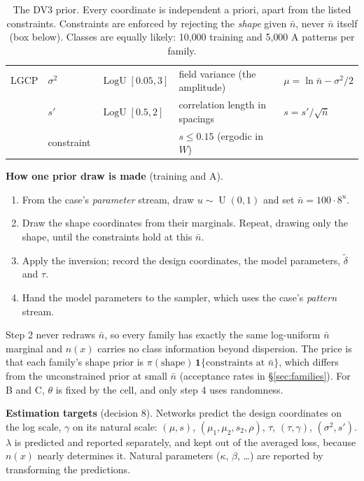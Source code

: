\documentclass[10pt,a4paper]{article}
\newcommand{\nbar}{\bar n}
\newcommand{\dtil}{\tilde\delta}
\newcommand{\LogU}{\operatorname{LogU}}
\newcommand{\Unif}{\operatorname{U}}
\newenvironment{keybox}{\par\smallskip\noindent\begin{lrbox}{\keyboxsave}\begin{minipage}{\dimexpr\linewidth-2\fboxsep-2\fboxrule\relax}\small\setlength{\parskip}{0.4em}}{\end{minipage}\end{lrbox}\fbox{\usebox{\keyboxsave}}\par\smallskip}
\begin{document}
\begin{table}[ht]
\begin{tabularx}{\linewidth}{@{}l l l L L@{}}
\addlinespace
LGCP & $\sigma^2$ & $\LogU[0.05,3]$ & field variance (the amplitude) & $\mu=\ln\nbar-\sigma^2/2$\\
 & $s'$ & $\LogU[0.5,2]$ & correlation length in spacings & $s=s'/\sqrt{\nbar}$\\
 & constraint & & $s\le0.15$ (ergodic in $W$) & \\
\bottomrule
\end{tabularx}
\caption{The DV3 prior. Every coordinate is independent a priori, apart from the listed constraints. Constraints are enforced by rejecting the \emph{shape} given $\nbar$, never $\nbar$ itself (box below). Classes are equally likely: 10{,}000 training and 5{,}000 A patterns per family.}
\label{tab:prior}
\end{table}

\begin{keybox}
\textbf{How one prior draw is made} (training and A).
\begin{enumerate}
  \item From the case's \emph{parameter} stream, draw $u\sim\Unif(0,1)$ and set $\nbar=100\cdot8^{u}$.
  \item Draw the shape coordinates from their marginals. Repeat, drawing only the shape, until the constraints hold at this $\nbar$.
  \item Apply the inversion; record the design coordinates, the model parameters, $\dtil$ and $\tau$.
  \item Hand the model parameters to the sampler, which uses the case's \emph{pattern} stream.
\end{enumerate}
Step 2 never redraws $\nbar$, so every family has exactly the same log-uniform $\nbar$ marginal and $n(x)$ carries no class information beyond dispersion. The price is that each family's shape prior is $\pi(\text{shape})\,\mathbf 1\{\text{constraints at }\nbar\}$, which differs from the unconstrained prior at small $\nbar$ (acceptance rates in \S\ref{sec:families}). For B and C, $\theta$ is fixed by the cell, and only step 4 uses randomness.
\end{keybox}

\textbf{Estimation targets} (decision 8). Networks predict the design coordinates on the log scale, $\gamma$ on its natural scale: $(\mu,s)$, $(\mu_1,\mu_2,s_2,\rho)$, $\tau$, $(\tau,\gamma)$, $(\sigma^2,s')$. $\lambda$ is predicted and reported separately, and kept out of the averaged loss, because $n(x)$ nearly determines it. Natural parameters ($\kappa$, $\beta$, \ldots) are reported by transforming the predictions.
\end{document}
